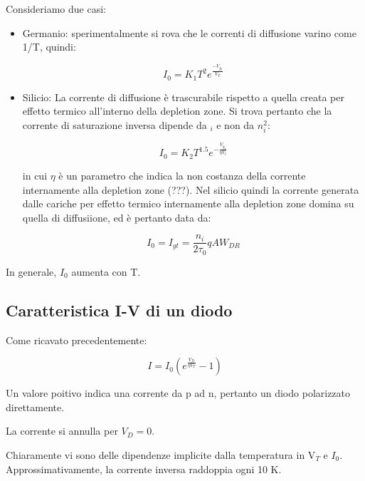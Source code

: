 \documentclass{article}
\begin{document}
Consideriamo due casi:

\begin{itemize}
    \item Germanio: sperimentalmente si rova che le correnti di diffusione varino come 1/T, quindi:

          \begin{equation}
              I_0=K_1T^2e^{\frac{-V_{g_0}}{V_T}}
          \end{equation}


    \item Silicio: La corrente di diffusione è trascurabile rispetto a quella creata per effetto termico
          all'interno della depletion zone. Si trova pertanto che la corrente di saturazione inversa dipende da $_i$ e non da $n_i^2$:

          \begin{equation}
              I_0=K_2T^{1.5}e^{-\frac{V_{g_0}}{\eta V_t}}
          \end{equation}

          in cui $\eta$ è un parametro che indica la non costanza della corrente internamente alla depletion zone (???).
          Nel silicio quindi la corrente generata dalle cariche per effetto termico internamente alla depletion zone domina su quella di diffusiione, ed è pertanto
          data da:

          \begin{equation}
              I_0=I_{gt}=\frac{n_i}{2\tau_0}qAW_{DR}
          \end{equation}

\end{itemize}

In generale, $I_0$ aumenta con T.


\subsection{Caratteristica I-V di un diodo}
Come ricavato precedentemente:

\begin{equation}
    I=I_0(e^{\frac{V_D}{\eta V_T}}-1)
\end{equation}

Un valore poitivo indica una corrente da p ad n, pertanto un diodo polarizzato direttamente.

La corrente si annulla per $V_D=0$.

Chiaramente vi sono delle dipendenze implicite dalla temperatura in V$_T$ e $I_0$. Approssimativamente, la
corrente inversa raddoppia ogni 10 K.
\end{document}
